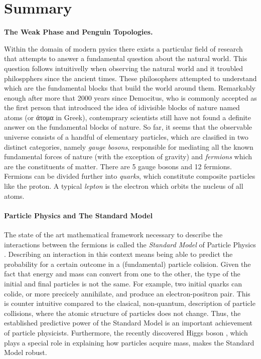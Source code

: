 \chapter*{Summary}
\chaptermark{}

{\Large\bf
  The Weak Phase \phis and Penguin Topologies.
}
\vspace*{0.05\textwidth}

Within the domain of modern pysics there exists a particular field of research
that attempts to answer a fundamental question about the natural world. This
question follows intuitivelly when observing the natural world and it troubled
philospphers since the ancient times. These philosophers attempted to understand
which are the fundamental blocks that build the world around them. Remarkably
enough after more that 2000 years since Democitus, who is commonly accepted as
the first person that introduced the idea of idivisible blocks of nature named
atoms (or \textgreek{άτομα} in Greek), contemprary scientists still have not found a definite
answer on the fundamental blocks of nature. So far, it seems that the observable
universe consists of a handful of elementary particles, which are clasified in two
distinct categories, namely {\it gauge bosons}, responsible for mediating all the
known fundamental forces of nature (with the exception of gravity) and {\it fermions}
which are the constituents of matter. There are 5 gauge bosons and 12 fermions.
Fermions can be divided further into {\it quarks}, which constitute composite
particles like the proton. A typical {\it lepton} is the electron which orbits
the nucleus of all atoms.

\subsubsection{Particle Physics and The Standard Model}
The state of the art mathematical framework necessary to describe the interactions between the
fermions is called the \textit{Standard Model} of Particle Physics \cite{sm-glashow,sm-weinberg,sm-salam}.
Describing an interaction in this context means being able to predict the probability for a certain
outcome in a (fundamental) particle colision. Given the fact that energy and mass can convert
from one to the other, the type of the initial and final particles is not the same. For example,
two initial quarks can colide, or more precicely annihilate, and produce an electron-positron pair.
This is counter intuitive compared to the clasical, non-quantum, description of particle collisions,
where the atomic structure of particles does not change. Thus, the established predictive power of
the Standard Model is an important achievement of particle physicists. Furthermore, the recently
discovered Higgs boson \cite{higgs-cms,higgs-atlas}, which plays a special role in explaining how
particles acquire mass, makes the Standard Model robust.

